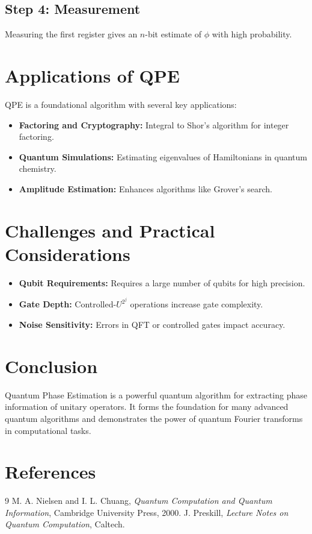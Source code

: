 \documentclass[11pt]{article}
\begin{document}
\subsection{Step 4: Measurement}
Measuring the first register gives an $n$-bit estimate of $\phi$ with high probability.

\newpage

\section{Applications of QPE}
QPE is a foundational algorithm with several key applications:
\begin{itemize}
    \item \textbf{Factoring and Cryptography:} Integral to Shor's algorithm for integer factoring.
    \item \textbf{Quantum Simulations:} Estimating eigenvalues of Hamiltonians in quantum chemistry.
    \item \textbf{Amplitude Estimation:} Enhances algorithms like Grover's search.
\end{itemize}

\section{Challenges and Practical Considerations}
\begin{itemize}
    \item \textbf{Qubit Requirements:} Requires a large number of qubits for high precision.
    \item \textbf{Gate Depth:} Controlled-$U^{2^j}$ operations increase gate complexity.
    \item \textbf{Noise Sensitivity:} Errors in QFT or controlled gates impact accuracy.
\end{itemize}

\section{Conclusion}
Quantum Phase Estimation is a powerful quantum algorithm for extracting phase information of unitary operators. It forms the foundation for many advanced quantum algorithms and demonstrates the power of quantum Fourier transforms in computational tasks.

\section{References}
\begin{thebibliography}{9}
 M. A. Nielsen and I. L. Chuang, \textit{Quantum Computation and Quantum Information}, Cambridge University Press, 2000.
 J. Preskill, \textit{Lecture Notes on Quantum Computation}, Caltech.
\end{thebibliography}
\end{document}
